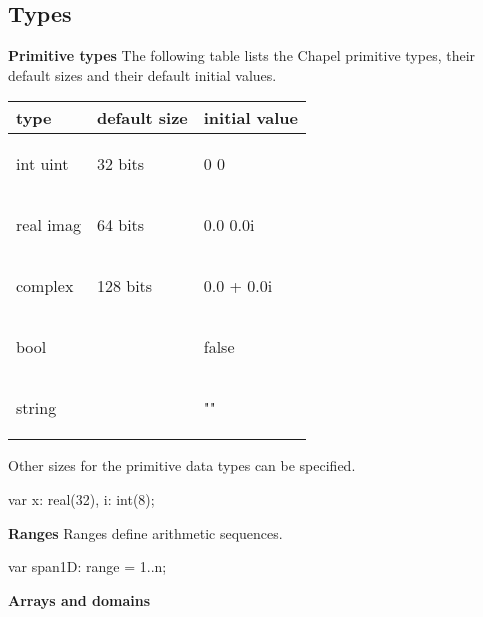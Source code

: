 \documentclass[landscape]{report}
\begin{document}
{\subsection*{Types} 
{\bf Primitive types} \newline
The following table lists the Chapel primitive types,
their default sizes and their default initial values.
\begin{center}
\begin{tabular}{|l|l|l|}
\hline
{\bf type} & {\bf default size} & {\bf initial value}\\
\hline
\begin{chapel}
int
uint
\end{chapel}
& 32 bits &
\begin{chapel}
0
0
\end{chapel} \\ 
\hline
\begin{chapel}
real
imag
\end{chapel}
& 64 bits &
\begin{chapel}
0.0
0.0i
\end{chapel} \\ 
\hline
\begin{chapel}
complex
\end{chapel}
& 128 bits &
\begin{chapel}
0.0 + 0.0i
\end{chapel} \\ 
\hline
\begin{chapel}
bool
\end{chapel} 
&  &
\begin{chapel}
false
\end{chapel}  \\ 
\hline
\begin{chapel}
string
\end{chapel}
&  &
\begin{chapel}
""
\end{chapel}  \\ 
\hline
\end{tabular}
\end{center}
Other sizes for the primitive data types can be
specified.
\begin{chapel}
var x: real(32), i: int(8); 
\end{chapel}
{\bf Ranges} \newline
Ranges define arithmetic sequences.
\begin{chapel}
var span1D: range = 1..n;
\end{chapel} 
{\bf Arrays and domains} \newline
}
\end{document}
